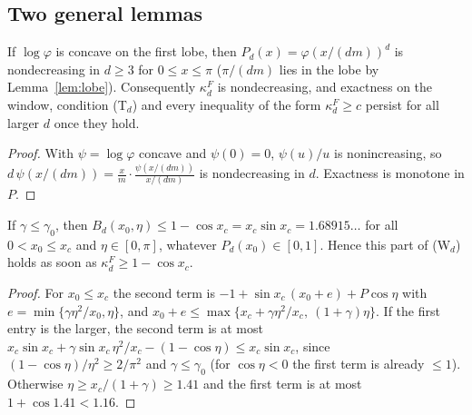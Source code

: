 \documentclass[11pt]{amsart}
\theoremstyle{definition}\newtheorem{definition}[theorem]{Definition}\theoremstyle{remark}\newtheorem{remark}[theorem]{Remark}
\begin{document}
\subsection{Two general lemmas}
\begin{lemma}[monotonicity in $d$]\label{lem:mono-d}
If $\log\varphi$ is concave on the first lobe, then $P_d(x)=\varphi(x/(dm))^d$ is nondecreasing in $d\ge3$ for $0\le x\le\pi$ ($\pi/(dm)$ lies in the lobe by Lemma~\ref{lem:lobe}). Consequently
$\kappa_d^F$ is nondecreasing, and exactness on the window, condition (T$_d$) and every inequality of the form $\kappa_d^F\ge c$ persist for all larger $d$ once they hold.
\end{lemma}
\begin{proof}With $\psi=\log\varphi$ concave and $\psi(0)=0$, $\psi(u)/u$ is nonincreasing, so $d\,\psi(x/(dm))=\frac xm\cdot\frac{\psi(x/(dm))}{x/(dm)}$ is nondecreasing in $d$. Exactness
is monotone in $P$.\end{proof}
\begin{lemma}\label{lem:binf}
If $\gamma\le\gamma_0$, then $B_d(x_0,\eta)\le1-\cos x_c=x_c\sin x_c=1.68915\ldots$ for all $0<x_0\le x_c$ and $\eta\in[0,\pi]$, whatever $P_d(x_0)\in[0,1]$. Hence this part of (W$_d$)
holds as soon as $\kappa_d^F\ge1-\cos x_c$.
\end{lemma}
\begin{proof}For $x_0\le x_c$ the second term is $-1+\sin x_c\,(x_0+e)+P\cos\eta$ with $e=\min\{\gamma\eta^2/x_0,\eta\}$, and $x_0+e\le\max\{x_c+\gamma\eta^2/x_c,\ (1+\gamma)\eta\}$. If the first
entry is the larger, the second term is at most $x_c\sin x_c+\gamma\sin x_c\,\eta^2/x_c-(1-\cos\eta)\le x_c\sin x_c$, since $(1-\cos\eta)/\eta^2\ge2/\pi^2$ and $\gamma\le\gamma_0$ (for $\cos\eta<0$
the first term is already $\le1$). Otherwise $\eta\ge x_c/(1+\gamma)\ge1.41$ and the first term is at most $1+\cos1.41<1.16$.\end{proof}
\end{document}
